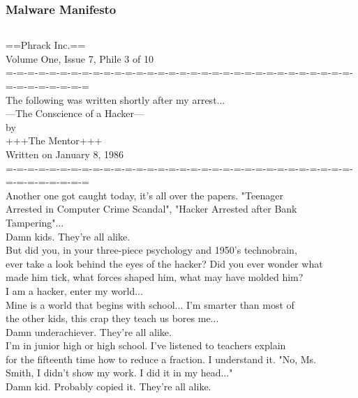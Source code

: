 \documentclass[aspectratio=169]{beamer}
\begin{document}
\begin{frame}
  \frametitle{Malware Manifesto}
  \begin{columns}
    \begingroup
    \fontsize{4pt}{4pt}\selectfont
    \begin{center}
    ==Phrack Inc.== \\
    \smallskip
    Volume One, Issue 7, Phile 3 of 10 \\
    \smallskip
    =-=-=-=-=-=-=-=-=-=-=-=-=-=-=-=-=-=-=-=-=-=-=-=-=-=-=-=-=-=-=-=-=-=-=-=-=-=-=-=\\
    The following was written shortly after my arrest...\\
    \smallskip
    ---The Conscience of a Hacker---\\
    \smallskip
    by\\
    \smallskip
    +++The Mentor+++\\
    \smallskip
    Written on January 8, 1986\\
    =-=-=-=-=-=-=-=-=-=-=-=-=-=-=-=-=-=-=-=-=-=-=-=-=-=-=-=-=-=-=-=-=-=-=-=-=-=-=-=\\
    \smallskip
    Another one got caught today, it's all over the papers.  "Teenager \\
    Arrested in Computer Crime Scandal", "Hacker Arrested after Bank Tampering"...\\
    \smallskip
    Damn kids.  They're all alike.\\
    \smallskip
    But did you, in your three-piece psychology and 1950's technobrain,\\
    ever take a look behind the eyes of the hacker?  Did you ever wonder what\\
    made him tick, what forces shaped him, what may have molded him?\\
    I am a hacker, enter my world...\\
    Mine is a world that begins with school... I'm smarter than most of\\
    the other kids, this crap they teach us bores me...\\
    Damn underachiever.  They're all alike.\\
    \smallskip
    I'm in junior high or high school.  I've listened to teachers explain\\
    for the fifteenth time how to reduce a fraction.  I understand it.  "No, Ms.\\
    Smith, I didn't show my work.  I did it in my head..."\\
    Damn kid.  Probably copied it.  They're all alike.\\

\end{center}
\end{columns}
\end{frame}
\end{document}
